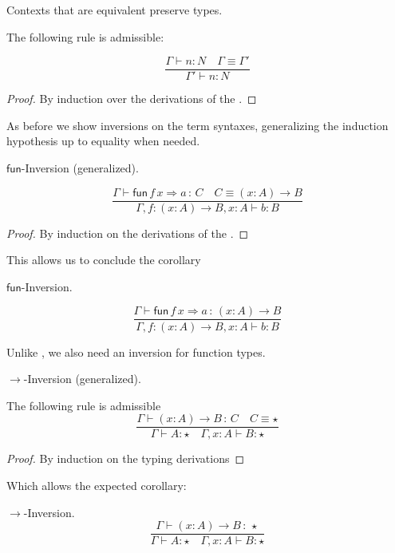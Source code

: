 \begin{lem}Contexts that are equivalent preserve types.
 
The following rule is admissible:
 
\[
\frac{\Gamma\vdash n:N\quad\Gamma\equiv\Gamma'}{\Gamma'\vdash n:N}
\]
\end{lem}
\begin{proof}
By induction over the derivations of the \csys{}.
\end{proof}

As before we show inversions on the term syntaxes, generalizing the induction hypothesis up to equality when needed.

\begin{lem} $\mathsf{fun}$-Inversion (generalized).
 
\[
\frac{\Gamma \vdash\mathsf{fun}\,f\,x\Rightarrow a\,:\,C\quad C\equiv\left(x:A\right)\rightarrow B}{\Gamma, f:\left(x:A\right)\rightarrow B,x:A\vdash b:B}
\]
\end{lem}
\begin{proof}
By induction on the derivations of the \csys{}.
\end{proof}
 
This allows us to conclude the corollary

\begin{cor} $\mathsf{fun}$-Inversion.
 
\[
\frac{\Gamma \vdash\mathsf{fun}\,f\,x\Rightarrow a\,:\,\left(x:A\right)\rightarrow B}{\Gamma, f:\left(x:A\right)\rightarrow B,x:A\vdash b:B}
\]
\end{cor}

Unlike , we also need an inversion for function types.

\begin{lem} $\rightarrow$-Inversion (generalized).
 
The following rule is admissible
\[
\frac{\Gamma \vdash\left(x:A\right)\rightarrow B\,:\,C\quad C\equiv\star}{\Gamma \vdash A:\star\quad \Gamma, x:A \vdash B:\star}
\]
\end{lem}
\begin{proof}
By induction on the typing derivations
\end{proof}

Which allows the expected corollary:

\begin{cor} $\rightarrow$-Inversion.
\[
\frac{\Gamma \vdash\left(x:A\right)\rightarrow B\,:\,\star}{\Gamma \vdash A:\star\quad \Gamma, x:A\vdash B:\star}
\]
\end{cor}
 
